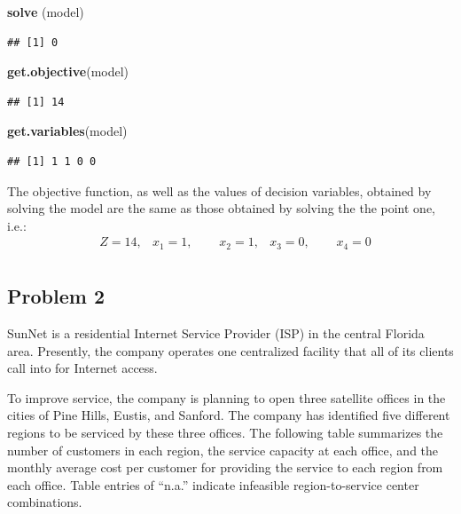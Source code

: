 \documentclass[]{article}
\newenvironment{Shaded}{\begin{snugshade}}{\end{snugshade}}
\newcommand{\KeywordTok}[1]{\textcolor[rgb]{0.13,0.29,0.53}{\textbf{#1}}}
\newcommand{\NormalTok}[1]{#1}
\begin{document}
\begin{Shaded}
\begin{Highlighting}[]
\KeywordTok{solve}\NormalTok{ (model)}
\end{Highlighting}
\end{Shaded}

\begin{verbatim}
## [1] 0
\end{verbatim}

\begin{Shaded}
\begin{Highlighting}[]
\KeywordTok{get.objective}\NormalTok{(model)}
\end{Highlighting}
\end{Shaded}

\begin{verbatim}
## [1] 14
\end{verbatim}

\begin{Shaded}
\begin{Highlighting}[]
\KeywordTok{get.variables}\NormalTok{(model)}
\end{Highlighting}
\end{Shaded}

\begin{verbatim}
## [1] 1 1 0 0
\end{verbatim}

The objective function, as well as the values of decision variables,
obtained by solving the model are the same as those obtained by solving
the the point one, i.e.: \[
\begin{aligned}
&Z = 14 ,
&x_{1} = 1,\:\: \: \:\: \: &x_{2} = 1,
&x_{3} = 0, \:\: \:\:\: \:
&x_{4} = 0 \\
\end{aligned}
\]

\hypertarget{problem-2}{%
\subsection{Problem 2}\label{problem-2}}

SunNet is a residential Internet Service Provider (ISP) in the central
Florida area. Presently, the company operates one centralized facility
that all of its clients call into for Internet access.

To improve service, the company is planning to open three satellite
offices in the cities of Pine Hills, Eustis, and Sanford. The company
has identified five different regions to be serviced by these three
offices. The following table summarizes the number of customers in each
region, the service capacity at each office, and the monthly average
cost per customer for providing the service to each region from each
office. Table entries of ``n.a.'' indicate infeasible region-to-service
center combinations.
\end{document}
